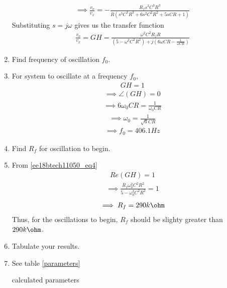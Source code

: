 \begin{enumerate}[label=\thesection.\arabic*.,ref=\thesection.\theenumi]
\begin{align}
    \implies \frac{v_o}{v_x} = -\frac{R_fs^3C^3R^3}{R(s^3C^3R^3+6s^2C^2R^2+5sCR+1)}
\end{align}
Substituting $s=j\omega$ gives us the transfer function
\begin{align}
    \frac{v_o}{v_x} = GH = \frac{\omega^2C^2R_fR}{(5-\omega^2C^2R^2)+j(6\omega CR-\frac{1}{\omega CR})}
    \label{ee18btech11050_eq2}
\end{align}

\item Find frequency of oscillation $f_0$.
\item \solution 
For system to oscillate at a frequency $f_0$, 
\begin{align}
    GH = 1
    \label{ee18btech11050_eq4}
\end{align}
\begin{align}
    \implies \angle(GH) = 0
\end{align}
\begin{align}
    \implies 6\omega_0 CR = \frac{1}{\omega_0 CR}
\end{align}
\begin{align}
    \implies \omega_0 = \frac{1}{\sqrt{6}CR}
\end{align}
\begin{align}
    \implies f_0 = 406.1 Hz
\end{align}
\item Find $R_f$ for oscillation to begin.
\item \solution From \eqref{ee18btech11050_eq4}
\begin{align}
    Re(GH) = 1
\end{align}
\begin{align}
    \implies \frac{R_f\omega_0^2C^2R^2}{5-\omega_0^2C^2R^2} = 1
\end{align}
\begin{align}
    \implies R_f = 290 k\ohm
\end{align}
Thus, for the oscillations to begin, $R_f$ should be slighty greater than $290k\ohm$.
\item Tabulate your results.
\item \solution See table \ref{parameters}
\begin{table}[!ht]
\centering

\caption{calculated parameters}
\label{parameters}
\end{table}

\end{enumerate}
